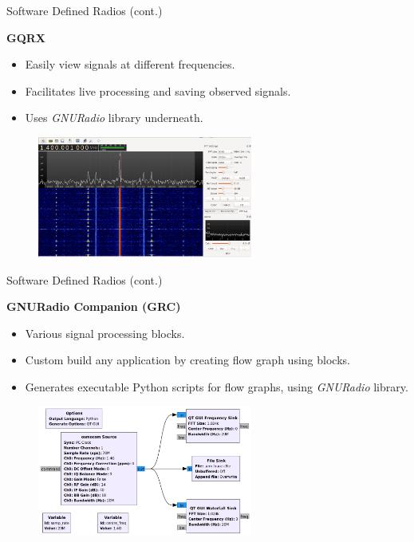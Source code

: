 \documentclass[handout]{beamer}
\begin{document}
\begin{frame}{Software Defined Radios (cont.)}  

\footnotesize
\textbf{GQRX}

	\begin{itemize}
	\footnotesize
	\item Easily view signals at different frequencies.
		\vspace{5pt}
	\item Facilitates live processing and saving observed signals.
		\vspace{5pt}
	\item Uses \emph{GNURadio} library underneath.
	\end{itemize}

	\begin{figure}
		\includegraphics[width=200pt]{figures/gqrx-window.png}
	\end{figure}

\end{frame}


\begin{frame}{Software Defined Radios (cont.)}  

\footnotesize
\textbf{GNURadio Companion (GRC)}

	\begin{itemize}
	\footnotesize
	\item Various signal processing blocks.
		\vspace{5pt}
	\item Custom build any application by creating flow graph using blocks.
		\vspace{5pt}
	\item Generates executable Python scripts for flow graphs, using \emph{GNURadio} library.
	\end{itemize}

	\begin{figure}
		\includegraphics[width=200pt]{figures/grc-flowgraph-for-data-acquisition.png}
	\end{figure}

\end{frame}
\end{document}
